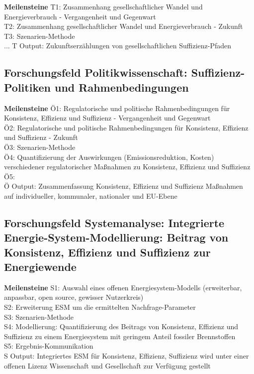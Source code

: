 \documentclass[a4paper,11pt,twoside]{scrartcl}
\begin{document}
\textbf{Meilensteine}
\hline
T1: Zusammenhang gesellschaftlicher Wandel und Energieverbrauch - Vergangenheit und Gegenwart\\
T2: Zusammenhang gesellschaftlicher Wandel und Energieverbrauch - Zukunft\\
T3: Szenarien-Methode\\
...
T Output: Zukunftserzählungen von gesellschaftlichen Suffizienz-Pfaden
\hline

\subsection*{Forschungsfeld Politikwissenschaft: Suffizienz-Politiken und Rahmenbedingungen}
\textbf{Meilensteine}
\hline
Ö1: Regulatorische und politische Rahmenbedingungen für Konsistenz, Effizienz und Suffizienz - Vergangenheit und Gegenwart\\
Ö2: Regulatorische und politische Rahmenbedingungen für Konsistenz, Effizienz und Suffizienz - Zukunft\\
Ö3: Szenarien-Methode\\
Ö4: Quantifizierung der Auswirkungen (Emissionsreduktion, Kosten) verschiedener regulatorischer Maßnahmen zu Konsistenz, Effizienz und Suffizienz\\
Ö5: \\
Ö Output: Zusammenfassung Konsistenz, Effizienz und Suffizienz Maßnahmen auf individueller, kommunaler, nationaler und EU-Ebene
\hline

\subsection*{Forschungsfeld Systemanalyse: Integrierte Energie-System-Modellierung: Beitrag von Konsistenz, Effizienz und Suffizienz zur Energiewende}

\textbf{Meilensteine}
\hline
S1: Auswahl eines offenen Energiesystem-Modells (erweiterbar, anpassbar, open source, gewisser Nutzerkreis)\\
S2: Erweiterung ESM um die ermittelten Nachfrage-Parameter\\
S3: Szenarien-Methode\\
S4: Modellierung: Quantifizierung des Beitrags von Konsistenz, Effizienz und Suffizienz zu einem Energiesystem mit geringem Anteil fossiler Brennstoffen\\
S5: Ergebnis-Kommunikation\\
S Output: Integriertes ESM für Konsistenz, Effizienz, Suffizienz wird unter einer offenen Lizenz Wissenschaft und Gesellschaft zur Verfügung gestellt
\hline
\end{document}
